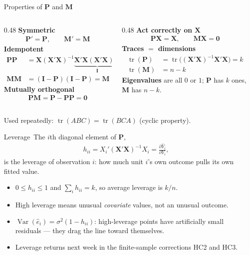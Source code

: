 \documentclass[aspectratio=169,11pt,xcolor=dvipsnames]{beamer}
\DeclareMathOperator{\Var}{Var}
\DeclareMathOperator{\trace}{tr}
\newcommand{\X}{\bm{X}}
\newcommand{\Ix}{\bm{I}}
\newcommand{\zero}{\bm{0}}
\newcommand{\Pm}{\bm{P}}
\newcommand{\Mm}{\bm{M}}
\newcommand{\adv}{\,\raisebox{0.6pt}{\textcolor{accent}{$\bigstar$}}}
\begin{document}
\begin{frame}{Properties of $\Pm$ and $\Mm$\adv}
\begin{columns}[T]
\begin{column}{0.48\textwidth}
\textbf{Symmetric}
\begin{align*}
  \Pm' = \Pm, \qquad \Mm' = \Mm
\end{align*}
\textbf{Idempotent}
\begin{align*}
  \Pm\Pm &= \X(\X'\X)^{-1}\underbrace{\X'\X(\X'\X)^{-1}}_{\Ix}\X' = \Pm\\
  \Mm\Mm &= (\Ix-\Pm)(\Ix-\Pm) = \Mm
\end{align*}
\textbf{Mutually orthogonal}
\begin{align*}
  \Pm\Mm = \Pm - \Pm\Pm = \zero
\end{align*}
\end{column}
\begin{column}{0.48\textwidth}
\textbf{Act correctly on $\X$}
\begin{align*}
  \Pm\X = \X, \qquad \Mm\X = \zero
\end{align*}
\textbf{Traces $=$ dimensions}
\begin{align*}
  \trace(\Pm) &= \trace\big((\X'\X)^{-1}\X'\X\big) = k\\
  \trace(\Mm) &= n - k
\end{align*}
\textbf{Eigenvalues} are all $0$ or $1$; $\Pm$ has $k$ ones, $\Mm$ has $n-k$.
\end{column}
\end{columns}
\vskip2pt
{\footnotesize Used repeatedly: $\trace(ABC)=\trace(BCA)$ (cyclic property).}
\end{frame}

\begin{frame}{Leverage\adv}
The $i$th diagonal element of $\Pm$,
\begin{align*}
  h_{ii} = X_i'(\X'\X)^{-1}X_i = \frac{\partial \hat Y_i}{\partial Y_i},
\end{align*}
is the \alert{leverage} of observation $i$: how much unit $i$'s own outcome pulls
its own fitted value.
\begin{itemize}\itemsep3pt
  \item $0 \leq h_{ii} \leq 1$ and $\sum_i h_{ii} = k$, so average leverage is
        $k/n$.
  \item High leverage means unusual \emph{covariate} values, not an unusual
        outcome.
  \item $\Var(\hat e_i) = \sigma^2(1-h_{ii})$: high-leverage points have
        artificially small residuals --- they drag the line toward themselves.
  \item Leverage returns next week in the finite-sample corrections HC2 and HC3.
\end{itemize}
\end{frame}
\end{document}
